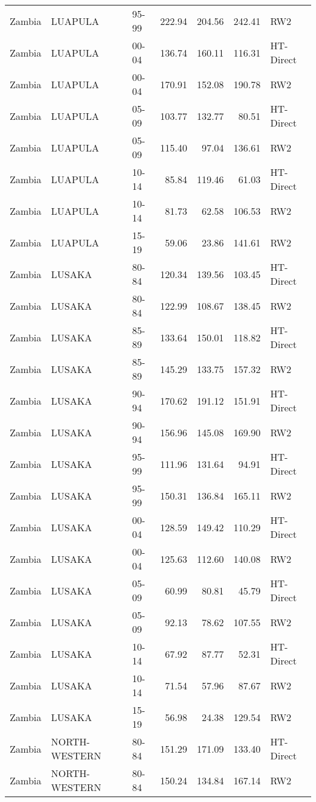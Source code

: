 \begin{longtable}{lllrrrl}
  Zambia & LUAPULA & 95-99 & 222.94 & 204.56 & 242.41 & RW2 \\ 
  Zambia & LUAPULA & 00-04 & 136.74 & 160.11 & 116.31 & HT-Direct \\ 
  Zambia & LUAPULA & 00-04 & 170.91 & 152.08 & 190.78 & RW2 \\ 
  Zambia & LUAPULA & 05-09 & 103.77 & 132.77 & 80.51 & HT-Direct \\ 
  Zambia & LUAPULA & 05-09 & 115.40 & 97.04 & 136.61 & RW2 \\ 
  Zambia & LUAPULA & 10-14 & 85.84 & 119.46 & 61.03 & HT-Direct \\ 
  Zambia & LUAPULA & 10-14 & 81.73 & 62.58 & 106.53 & RW2 \\ 
  Zambia & LUAPULA & 15-19 & 59.06 & 23.86 & 141.61 & RW2 \\ 
  Zambia & LUSAKA & 80-84 & 120.34 & 139.56 & 103.45 & HT-Direct \\ 
  Zambia & LUSAKA & 80-84 & 122.99 & 108.67 & 138.45 & RW2 \\ 
  Zambia & LUSAKA & 85-89 & 133.64 & 150.01 & 118.82 & HT-Direct \\ 
  Zambia & LUSAKA & 85-89 & 145.29 & 133.75 & 157.32 & RW2 \\ 
  Zambia & LUSAKA & 90-94 & 170.62 & 191.12 & 151.91 & HT-Direct \\ 
  Zambia & LUSAKA & 90-94 & 156.96 & 145.08 & 169.90 & RW2 \\ 
  Zambia & LUSAKA & 95-99 & 111.96 & 131.64 & 94.91 & HT-Direct \\ 
  Zambia & LUSAKA & 95-99 & 150.31 & 136.84 & 165.11 & RW2 \\ 
  Zambia & LUSAKA & 00-04 & 128.59 & 149.42 & 110.29 & HT-Direct \\ 
  Zambia & LUSAKA & 00-04 & 125.63 & 112.60 & 140.08 & RW2 \\ 
  Zambia & LUSAKA & 05-09 & 60.99 & 80.81 & 45.79 & HT-Direct \\ 
  Zambia & LUSAKA & 05-09 & 92.13 & 78.62 & 107.55 & RW2 \\ 
  Zambia & LUSAKA & 10-14 & 67.92 & 87.77 & 52.31 & HT-Direct \\ 
  Zambia & LUSAKA & 10-14 & 71.54 & 57.96 & 87.67 & RW2 \\ 
  Zambia & LUSAKA & 15-19 & 56.98 & 24.38 & 129.54 & RW2 \\ 
  Zambia & NORTH-WESTERN & 80-84 & 151.29 & 171.09 & 133.40 & HT-Direct \\ 
  Zambia & NORTH-WESTERN & 80-84 & 150.24 & 134.84 & 167.14 & RW2 \\ 

\end{longtable}
